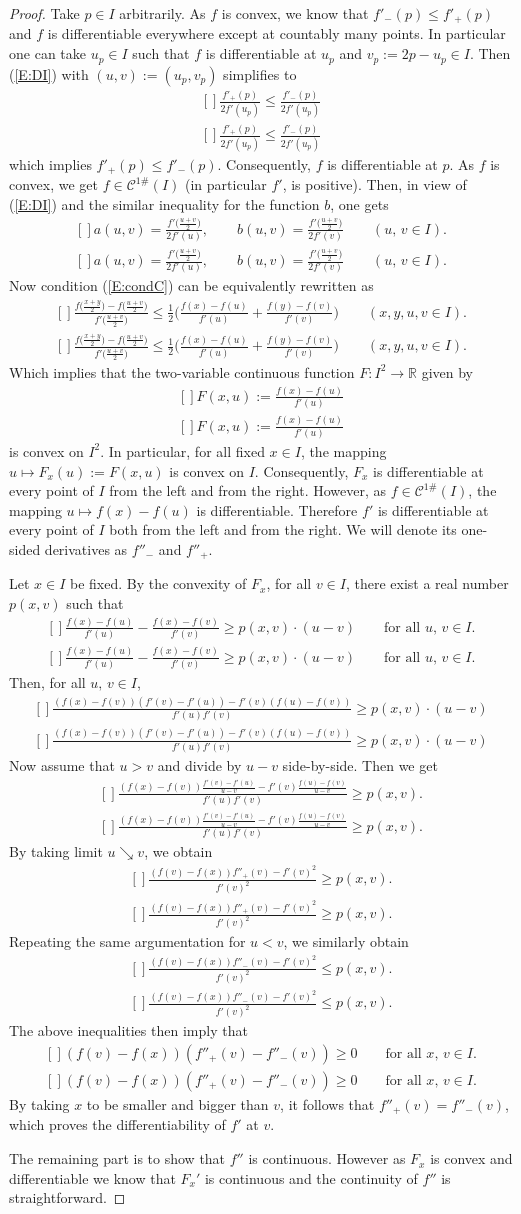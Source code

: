 \documentclass[12pt,oneside]{amsart}
\theoremstyle{definition}
\numberwithin{equation}{section}
\def\eq#1{{\rm(\ref{#1})}}
\def\Eq#1#2{\ifthenelse{\equal{#1}{*}}
  {\begin{equation*}\begin{aligned}[]#2\end{aligned}\end{equation*}}
  {\begin{equation}\begin{aligned}[]\label{#1}#2\end{aligned}\end{equation}}}
\newcommand\R{\mathbb{R}}
\begin{document}
\begin{proof}
Take $p \in I$ arbitrarily. As $f$ is convex, we know that $f'_-(p) \le f'_+(p)$ and $f$ is differentiable everywhere except at countably many points. In particular one can take $u_p \in I$ such that $f$ is differentiable at $u_p$ and $v_p:=2p-u_p \in I$. Then \eq{E:DI} with $(u,v):=(u_p,v_p)$ simplifies to 
\Eq{*}{
\frac{f'_+(p)}{2f'(u_p)} \le \frac{f'_-(p)}{2f'(u_p)}
}
which implies $f'_+(p) \le f'_-(p)$. Consequently, $f$ is differentiable at $p$. As $f$ is convex, we get $f \in \mathcal{C}^{1\#}(I)$ (in particular $f'$, is positive). Then, in view of \eq{E:DI} and the similar inequality for the function $b$, one gets
\Eq{*}{
a(u,v) =\frac{f'\big( \frac{u+v}2\big)}{2f'(u)}, \qquad b(u,v)=\frac{f'\big( \frac{u+v}2\big)}{2f'(v)} \qquad (u,\, v \in I).
}
Now condition \eq{E:condC} can be equivalently rewritten as 
\Eq{E:condC1}{
\frac{f\big( \tfrac{x+y}2\big)-f\big( \tfrac{u+v}2\big)}{f'\big( \frac{u+v}2\big)}\le \frac12 \bigg( \frac{f(x)-f(u)}{f'(u)} + \frac{f(y)-f(v)}{f'(v)}\bigg)\qquad (x,y,u,v \in I).
}
Which implies that the two-variable continuous function $F \colon I^2 \to \R$ given by
\Eq{*}{
F(x,u):=\frac{f(x)-f(u)}{f'(u)}
}
is convex on $I^2$. In particular, for all fixed $x\in I$, the mapping $u\mapsto F_x(u):=F(x,u)$ is convex on $I$. Consequently, $F_x$ is differentiable at every point of $I$ from the left and from the right. However, as $f \in \mathcal{C}^{1\#}(I)$, the mapping $u \mapsto f(x)-f(u)$ is differentiable. Therefore $f'$ is differentiable at every point of $I$ both from the left and from the right. We will denote its one-sided derivatives as $f''_-$ and $f''_+$.

Let $x\in I$ be fixed. By the convexity of $F_x$, for all $v \in I$, there exist a real number $p(x,v)$ such that 
\Eq{*}{
\frac{f(x)-f(u)}{f'(u)} - \frac{f(x)-f(v)}{f'(v)} \ge p(x,v)\cdot(u-v) \qquad\text{for all }u,\,v \in I.
}
Then, for all $u,\,v \in I$,
\Eq{*}{
\frac{(f(x)-f(v))(f'(v)-f'(u))-f'(v)(f(u)-f(v))}{f'(u)f'(v)} \ge p(x,v)\cdot (u-v) 
}
Now assume that $u>v$ and divide by $u-v$ side-by-side. Then we get
\Eq{*}{
\frac{(f(x)-f(v))\frac{f'(v)-f'(u)}{u-v}-f'(v)\frac{f(u)-f(v)}{u-v}}{f'(u)f'(v)} \ge p(x,v).
}
By taking limit $u \searrow v$, we obtain
\Eq{*}{
\frac{(f(v)-f(x))f''_+(v)-f'(v)^2}{f'(v)^2} \ge p(x,v).
}
Repeating the same argumentation for $u<v$, we similarly obtain 
\Eq{*}{
\frac{(f(v)-f(x))f''_-(v)-f'(v)^2}{f'(v)^2} \le p(x,v).
}
The above inequalities then imply that
\Eq{*}{
  (f(v)-f(x))(f''_+(v)-f''_-(v))\ge0 \qquad\text{for all }x,\,v \in I.
}
By taking $x$ to be smaller and bigger than $v$, it follows that $f''_+(v)=f''_-(v)$, which proves the differentiability of $f'$ at $v$.

The remaining part is to show that $f''$ is continuous. However as $F_x$ is convex and differentiable we know that $F_x'$ is continuous and the continuity of $f''$ is straightforward.
\end{proof}
\end{document}
